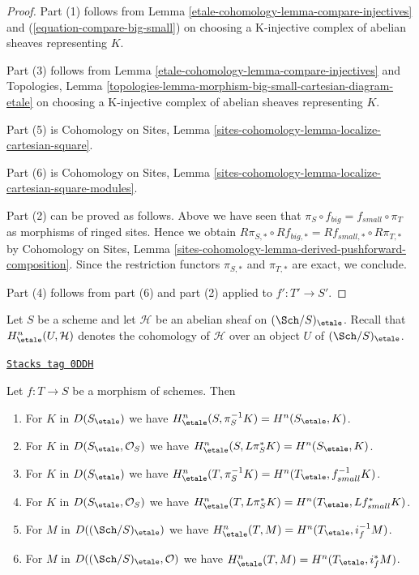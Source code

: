 \begin{proof}
Part (1) follows from
Lemma \ref{etale-cohomology-lemma-compare-injectives}
and (\ref{equation-compare-big-small})
on choosing a K-injective complex of abelian sheaves representing $K$.

\medskip\noindent
Part (3) follows from Lemma \ref{etale-cohomology-lemma-compare-injectives}
and Topologies, Lemma
\ref{topologies-lemma-morphism-big-small-cartesian-diagram-etale}
on choosing a K-injective complex of abelian sheaves representing $K$.

\medskip\noindent
Part (5) is Cohomology on Sites, Lemma
\ref{sites-cohomology-lemma-localize-cartesian-square}.

\medskip\noindent
Part (6) is Cohomology on Sites, Lemma
\ref{sites-cohomology-lemma-localize-cartesian-square-modules}.

\medskip\noindent
Part (2) can be proved as follows. Above we have seen
that $\pi_S \circ f_{big} = f_{small} \circ \pi_T$ as morphisms
of ringed sites. Hence we obtain
$R\pi_{S, *} \circ Rf_{big, *} = Rf_{small, *} \circ R\pi_{T, *}$
by Cohomology on Sites, Lemma
\ref{sites-cohomology-lemma-derived-pushforward-composition}.
Since the restriction functors $\pi_{S, *}$ and $\pi_{T, *}$
are exact, we conclude.

\medskip\noindent
Part (4) follows from part (6) and part (2) applied to $f' : T' \to S'$.
\end{proof}

Let $S$ be a scheme and let $\mathcal{H}$ be an abelian sheaf on
$(\Sch/S)_\etale$. Recall that $H^n_\etale(U, \mathcal{H})$ denotes
the cohomology of $\mathcal{H}$ over an object $U$ of $(\Sch/S)_\etale$.

\begin{lemma}
\label{etale-cohomology-lemma-compare-cohomology}
\href{https://stacks.math.columbia.edu/tag/0DDH}{\texttt{Stacks tag 0DDH}}

Let $f : T \to S$ be a morphism of schemes. Then
\begin{enumerate}
\item For $K$ in $D(S_\etale)$ we have
$H^n_\etale(S, \pi_S^{-1}K) = H^n(S_\etale, K)$.
\item For $K$ in $D(S_\etale, \mathcal{O}_S)$ we have
$H^n_\etale(S, L\pi_S^*K) = H^n(S_\etale, K)$.
\item For $K$ in $D(S_\etale)$ we have
$H^n_\etale(T, \pi_S^{-1}K) = H^n(T_\etale, f_{small}^{-1}K)$.
\item For $K$ in $D(S_\etale, \mathcal{O}_S)$ we have
$H^n_\etale(T, L\pi_S^*K) = H^n(T_\etale, Lf_{small}^*K)$.
\item For $M$ in $D((\Sch/S)_\etale)$ we have
$H^n_\etale(T, M) = H^n(T_\etale, i_f^{-1}M)$.
\item For $M$ in $D((\Sch/S)_\etale, \mathcal{O})$ we have
$H^n_\etale(T, M) = H^n(T_\etale, i_f^*M)$.
\end{enumerate}
\end{lemma}

